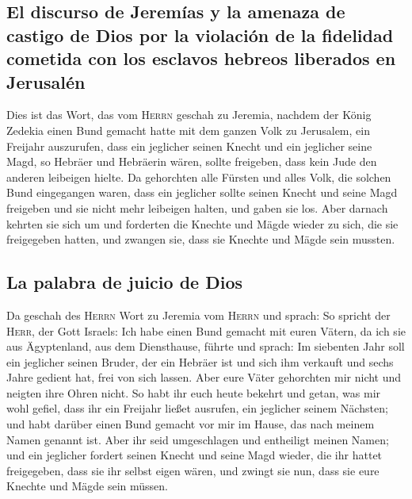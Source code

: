 \hypertarget{el-discurso-de-jeremuxedas-y-la-amenaza-de-castigo-de-dios-por-la-violaciuxf3n-de-la-fidelidad-cometida-con-los-esclavos-hebreos-liberados-en-jerusaluxe9n}{%
\subsection{El discurso de Jeremías y la amenaza de castigo de Dios por
la violación de la fidelidad cometida con los esclavos hebreos liberados
en
Jerusalén}\label{el-discurso-de-jeremuxedas-y-la-amenaza-de-castigo-de-dios-por-la-violaciuxf3n-de-la-fidelidad-cometida-con-los-esclavos-hebreos-liberados-en-jerusaluxe9n}}

 Dies ist das Wort, das vom \textsc{Herrn} geschah zu
Jeremia, nachdem der König Zedekia einen Bund gemacht hatte mit dem
ganzen Volk zu Jerusalem, ein Freijahr auszurufen,  dass
ein jeglicher seinen Knecht und ein jeglicher seine Magd, so Hebräer und
Hebräerin wären, sollte freigeben, dass kein Jude den anderen leibeigen
hielte.  Da gehorchten alle Fürsten und alles Volk, die
solchen Bund eingegangen waren, dass ein jeglicher sollte seinen Knecht
und seine Magd freigeben und sie nicht mehr leibeigen halten, und gaben
sie los.  Aber darnach kehrten sie sich um und forderten
die Knechte und Mägde wieder zu sich, die sie freigegeben hatten, und
zwangen sie, dass sie Knechte und Mägde sein mussten.

\hypertarget{la-palabra-de-juicio-de-dios}{%
\subsection{La palabra de juicio de
Dios}\label{la-palabra-de-juicio-de-dios}}

 Da geschah des \textsc{Herrn} Wort zu Jeremia vom
\textsc{Herrn} und sprach:  So spricht der \textsc{Herr},
der Gott Israels: Ich habe einen Bund gemacht mit euren Vätern, da ich
sie aus Ägyptenland, aus dem Diensthause, führte und sprach:
 Im siebenten Jahr soll ein jeglicher seinen Bruder, der
ein Hebräer ist und sich ihm verkauft und sechs Jahre gedient hat, frei
von sich lassen. Aber eure Väter gehorchten mir nicht und neigten ihre
Ohren nicht.  So habt ihr euch heute bekehrt und getan,
was mir wohl gefiel, dass ihr ein Freijahr ließet ausrufen, ein
jeglicher seinem Nächsten; und habt darüber einen Bund gemacht vor mir
im Hause, das nach meinem Namen genannt ist.  Aber ihr
seid umgeschlagen und entheiligt meinen Namen; und ein jeglicher fordert
seinen Knecht und seine Magd wieder, die ihr hattet freigegeben, dass
sie ihr selbst eigen wären, und zwingt sie nun, dass sie eure Knechte
und Mägde sein müssen.

